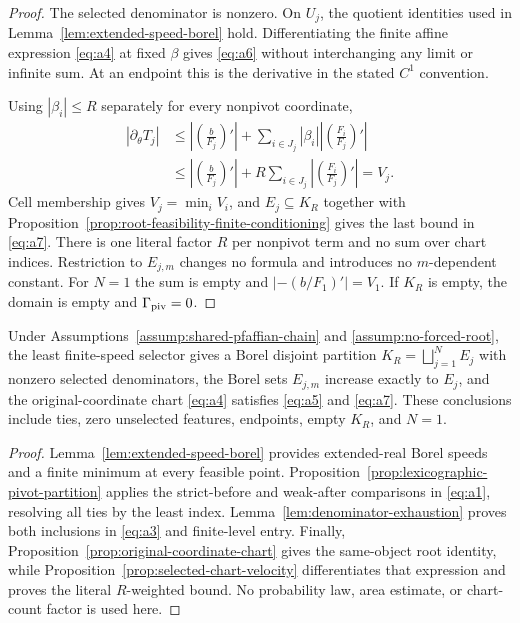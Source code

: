 \begin{proof}
The selected denominator is nonzero.  On $U_j$, the quotient identities
used in Lemma~\ref{lem:extended-speed-borel} hold.  Differentiating the
finite affine expression \eqref{eq:a4} at fixed $\beta$ gives
\eqref{eq:a6} without interchanging any limit or infinite sum.  At an
endpoint this is the derivative in the stated $C^1$ convention.

Using $|\beta_i|\leq R$ separately for every nonpivot coordinate,
\[
\begin{aligned}
|\partial_\theta T_j|
&\leq\left|\left(\frac b{F_j}\right)'\right|
 +\sum_{i\in J_j}|\beta_i|
  \left|\left(\frac{F_i}{F_j}\right)'\right|\\
&\leq\left|\left(\frac b{F_j}\right)'\right|
 +R\sum_{i\in J_j}
  \left|\left(\frac{F_i}{F_j}\right)'\right|=V_j.
\end{aligned}
\]
Cell membership gives $V_j=\min_iV_i$, and
$E_j\subseteq K_R$ together with
Proposition~\ref{prop:root-feasibility-finite-conditioning} gives the last
bound in \eqref{eq:a7}.  There is one literal factor $R$ per nonpivot term
and no sum over chart indices.  Restriction to $E_{j,m}$ changes no formula
and introduces no $m$-dependent constant.  For $N=1$ the sum is empty and
$|-(b/F_1)'|=V_1$.  If $K_R$ is empty, the domain is empty and
$\Gamma_{\rm piv}=0$.
\end{proof}

\begin{proposition}
\label{prop:measurable-adaptive-charts}
Under Assumptions~\ref{assump:shared-pfaffian-chain} and
\ref{assump:no-forced-root}, the least finite-speed selector gives a Borel
disjoint partition $K_R=\bigsqcup_{j=1}^NE_j$ with nonzero selected
denominators, the Borel sets $E_{j,m}$ increase exactly to $E_j$, and the
original-coordinate chart \eqref{eq:a4} satisfies \eqref{eq:a5} and
\eqref{eq:a7}.  These conclusions include ties, zero unselected features,
endpoints, empty $K_R$, and $N=1$.
\end{proposition}

\begin{proof}
Lemma~\ref{lem:extended-speed-borel} provides extended-real Borel speeds and
a finite minimum at every feasible point.
Proposition~\ref{prop:lexicographic-pivot-partition} applies the
strict-before and weak-after comparisons in \eqref{eq:a1}, resolving all
ties by the least index.  Lemma~\ref{lem:denominator-exhaustion} proves both
inclusions in \eqref{eq:a3} and finite-level entry.  Finally,
Proposition~\ref{prop:original-coordinate-chart} gives the same-object root
identity, while Proposition~\ref{prop:selected-chart-velocity}
differentiates that expression and proves the literal $R$-weighted bound.
No probability law, area estimate, or chart-count factor is used here.
\end{proof}

